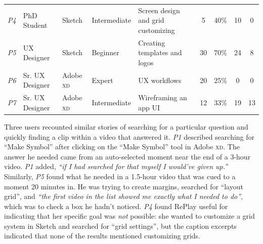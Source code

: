 \begin{table}[t]
{\begin{tabular}{lllllcccc}
\textit{P4}          & PhD Student              & Sketch                & Intermediate  & Screen design and grid customizing                                           & 5                                                                             & 40\%                                                                                            & 10                   & 0                                                                                         \\
\textit{P5}          & UX Designer              & Sketch                & Beginner      & Creating templates and logos                                                 & 30                                                                            & 70\%                                                                                           & 24                   & 8                                                                                         \\
\textit{P6}          & Sr. UX Designer       & Adobe \textsc{xd}     & Expert        & UX workflows                                                                 & 20                                                                            & 25\%                                                                                            & \phantom{0}0                    & 0                                                                                         \\
\textit{P7}          & Sr. UX Designer       & Adobe \textsc{xd}     & Intermediate  & Wireframing an app UI                                                        & 12                                                                            & 33\%                                                                                            & 19                   & 13\phantom{0}                                                                                       
\end{tabular}
}
\end{table}

Three users recounted similar stories of searching for a particular question and quickly finding a clip within a video that answered it. \textit{P1} described searching for ``Make Symbol'' after clicking on the ``Make Symbol'' tool in Adobe \textsc{xd}. The answer he needed came from an auto-selected moment near the end of a 3-hour video. \textit{P1} added, \textit{``if I had searched for that myself I would've given up.''} Similarly, \textit{P5} found what he needed in a 1.5-hour video that was cued to a moment 20 minutes in. He was trying to create margins, searched for ``layout grid'', and \textit{``the first video in the list showed me exactly what I needed to do''}, which was to check a box he hadn't noticed. \textit{P4} found RePlay useful for indicating that her specific goal was \textit{not} possible: she wanted to customize a grid system in Sketch and searched for ``grid settings'', but the caption excerpts indicated that none of the results mentioned customizing grids.

